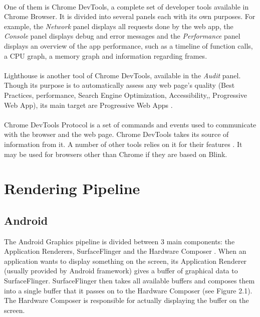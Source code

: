 \documentclass{kththesis}
\begin{document}
\paragraph{}
One of them is Chrome DevTools, a complete set of developer tools available in Chrome Browser. It is divided into several panels each with its own purposes. For example, the \textit{Network} panel displays all requests done by the web app, the \textit{Console} panel displays debug and error messages and the \textit{Performance} panel \cite{chrome_devtools_perf} displays an overview of the app performance, such as a timeline of function calls, a CPU graph, a memory graph and information regarding frames. 

\paragraph{}
Lighthouse \cite{lighthouse} is another tool of Chrome DevTools, available in the \textit{Audit} panel. Though its purpose is to automatically assess any web page's quality (Best Practices, performance, Search Engine Optimization, Accessibility,, Progressive Web App), its main target are Progressive Web Apps \cite{PWApossibleUnifer}. 

\paragraph{}
Chrome DevTools Protocol \cite{CDP} is a set of commands and events used to communicate with the browser and the web page. Chrome DevTools takes its source of information from it. A number of other tools relies on it for their features \cite{awesome_CDP}. It may be used for browsers other than Chrome if they are based on Blink.



\section{Rendering Pipeline}

\subsection{Android}

The Android Graphics pipeline is divided between 3 main components: the Application Renderers, SurfaceFlinger and the Hardware Composer \cite{android_graphics}.
When an application wants to display something on the screen, its Application Renderer (usually provided by Android framework) gives a buffer of graphical data to SurfaceFlinger. SurfaceFlinger then takes all available buffers and composes them into a single buffer that it passes on to the Hardware Composer (see Figure 2.1). The Hardware Composer is responsible for actually displaying the buffer on the screen.
\newline
\end{document}
